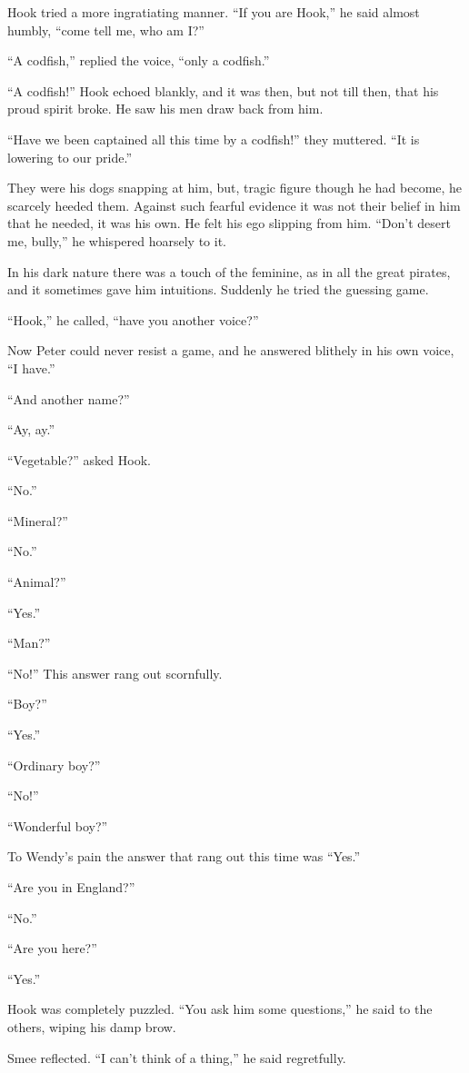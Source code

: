Hook tried a more ingratiating manner.
“If you are Hook,” he said almost humbly, “come tell me, who am I\@?”

“A codfish,” replied the voice, “only a codfish.”

“A codfish!\@” Hook echoed blankly, and it was then, but not till then, that his proud spirit broke.
He saw his men draw back from him.

“Have we been captained all this time by a codfish!\@” they muttered.
“It is lowering to our pride.”

They were his dogs snapping at him, but, tragic figure though he had become, he scarcely heeded them.
Against such fearful evidence it was not their belief in him that he needed, it was his own.
He felt his ego slipping from him.
“Don’t desert me, bully,” he whispered hoarsely to it.

In his dark nature there was a touch of the feminine, as in all the great pirates,
and it sometimes gave him intuitions.
Suddenly he tried the guessing game.

“Hook,” he called, “have you another voice?”

Now Peter could never resist a game, and he answered blithely in his own voice, “I have.”

“And another name?”

“Ay, ay.”

“Vegetable?\@” asked Hook.

“No.”

“Mineral?”

“No.”

“Animal?”

“Yes.”

“Man?”

“No!”
This answer rang out scornfully.

“Boy?”

“Yes.”

“Ordinary boy?”

“No!”

“Wonderful boy?”

To Wendy’s pain the answer that rang out this time was “Yes.”

“Are you in England?”

“No.”

“Are you here?”

“Yes.”

Hook was completely puzzled.
“You ask him some questions,” he said to the others, wiping his damp brow.

Smee reflected.
“I can’t think of a thing,” he said regretfully.

